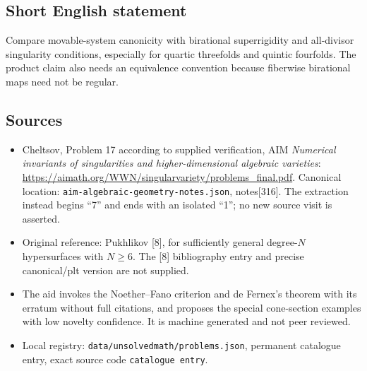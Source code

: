\documentclass[11pt]{article}
\begin{document}
\subsection{Short English statement}
Compare movable-system canonicity with birational superrigidity and all-divisor singularity conditions, especially for quartic threefolds and quintic fourfolds. The product claim also needs an equivalence convention because fiberwise birational maps need not be regular.
\subsection{Sources}
\begin{itemize}
\item Cheltsov, Problem 17 according to supplied verification, AIM \emph{Numerical invariants of singularities and higher-dimensional algebraic varieties}: \url{https://aimath.org/WWN/singularvariety/problems_final.pdf}. Canonical location: \texttt{aim-algebraic-geometry-notes.json}, notes[316]. The extraction instead begins ``7'' and ends with an isolated ``1''; no new source visit is asserted.
\item Original reference: Pukhlikov [8], for sufficiently general degree-$N$ hypersurfaces with $N\ge6$. The [8] bibliography entry and precise canonical/plt version are not supplied.
\item The aid invokes the Noether--Fano criterion and de Fernex's theorem with its erratum without full citations, and proposes the special cone-section examples with low novelty confidence. It is machine generated and not peer reviewed.
\item Local registry: \texttt{data/unsolvedmath/problems.json}, permanent catalogue entry, exact source code \texttt{catalogue entry}.
\end{itemize}
\end{document}

